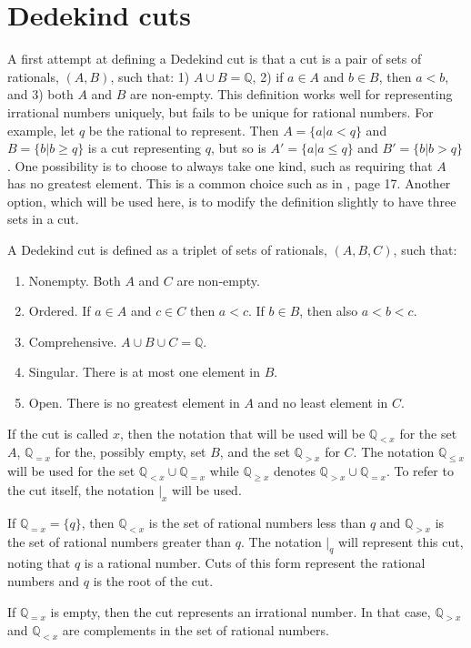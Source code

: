 \documentclass[12pt]{article}
\newcommand{\qcut}[2][x]{\ensuremath{\mathbb{Q}_{#2 #1}}}
\newcommand{\qlt}[1][x]{\qcut[#1]{<}}
\newcommand{\qeq}[1][x]{\qcut[#1]{=}}
\newcommand{\qgt}[1][x]{\qcut[#1]{>}}
\newcommand{\qgeq}[1][x]{\qcut[#1]{\geq}}
\newcommand{\qleq}[1][x]{\qcut[#1]{\leq}}
\newcommand{\cut}[1][x]{{\vert}_{#1} }
\begin{document}
\section{Dedekind cuts}

A first attempt at defining a Dedekind cut is that a cut is a pair of sets of rationals, $(A, B)$, such that: 1) $A \cup B = \mathbb{Q}$, 2) if $a \in A$ and $b \in B$, then $a < b$, and 3) both $A$ and $B$ are non-empty. This definition works well for representing irrational numbers uniquely, but fails to be unique for rational numbers. For example, let $q$ be the rational to represent. Then $A = \{a | a < q\}$ and $B= \{b | b \geq q\}$ is a cut representing $q$, but so is  $A' = \{a | a \leq q\}$ and $B'= \{b | b > q\}$. One possibility is to choose to always take one kind, such as requiring that $A$ has no greatest element. This is a common choice such as in \cite{rudin}, page 17. Another option, which will be used here, is to modify the definition slightly to have three sets in a cut.

A Dedekind cut is defined as a triplet of sets of rationals, $(A, B, C)$, such that: 
\begin{enumerate}
    \item Nonempty. Both $A$ and $C$ are non-empty.
    \item Ordered. If $a \in A$ and $c \in C$ then $a < c$. If $b \in B$, then also $a < b < c$. 
    \item Comprehensive. $A \cup B \cup C = \mathbb{Q}$.
    \item Singular. There is at most one element in $B$.
    \item Open. There is no greatest element in $A$ and no least element in $C$.
\end{enumerate}
If the cut is called $x$, then the notation that will be used will be $\qlt$ for the set $A$, $\qeq$ for the, possibly empty, set $B$, and the set $\qgt$ for $C$. The notation $\qleq$ will be used for the set $\qlt \cup \qeq$ while $\qgeq$ denotes $\qgt \cup \qeq$. To refer to the cut itself, the notation $\cut$ will be used. 



If $\qeq = \{q\}$, then $\qlt$ is the set of rational numbers less than $q$ and $\qgt$ is the set of rational numbers greater than $q$. The notation $\cut[q]$ will represent this cut, noting that $q$ is a rational number. Cuts of this form represent the rational numbers and $q$ is the root of the cut. 

If $\qeq$ is empty, then the cut represents an irrational number. In that case, $\qgt$ and $\qlt$ are complements in the set of rational numbers. 
\end{document}
